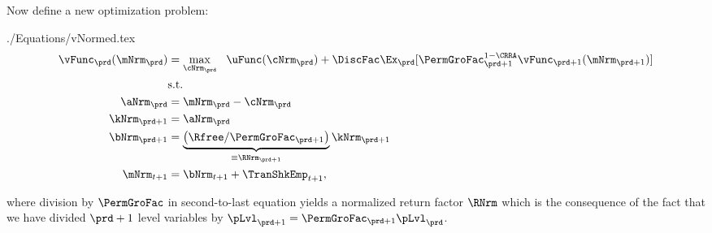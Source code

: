 \documentclass[\econtexRoot/SolvingMicroDSOPs]{subfiles}
\begin{document}
Now define a new optimization problem:
\begin{verbatimwrite}{./Equations/vNormed.tex}
  \begin{equation}\begin{gathered}\begin{aligned}
        \vFunc_{\prd}(\mNrm_{\prd}) & = \max_{{\cNrm}_{\prd}} ~~ \uFunc(\cNrm_{\prd})+{\DiscFac}\Ex_{\prd}[ \PermGroFac_{\prd+1}^{1-\CRRA}\vFunc_{\prd+1}(\mNrm_{\prd+1})] \label{eq:vNormed}                   \\
                                         & \text{s.t.}                                                                                 \\
        \aNrm_{\prd}                       & = \mNrm_{\prd}-\cNrm_{\prd}                                                                     \\
        \kNrm_{\prd+1}                     & = \aNrm_{\prd}                                                                                \\
        \bNrm_{\prd+1}                     & = \underbrace{\left(\Rfree/\PermGroFac_{\prd+1}\right)}_{\equiv \RNrm_{\prd+1}}\kNrm_{\prd+1} \\
        \mNrm_{t+1}                        & = \bNrm_{t+1}+\TranShkEmp_{t+1},
      \end{aligned}\end{gathered}\end{equation}
\end{verbatimwrite}
\unskip
where division by $\PermGroFac$ in second-to-last equation yields a normalized return factor $\RNrm$ which is the consequence of the fact that we have divided $\prd+1$ level variables by $\pLvl_{\prd+1}=\PermGroFac_{\prd+1}\pLvl_{\prd}$.
\end{document}
